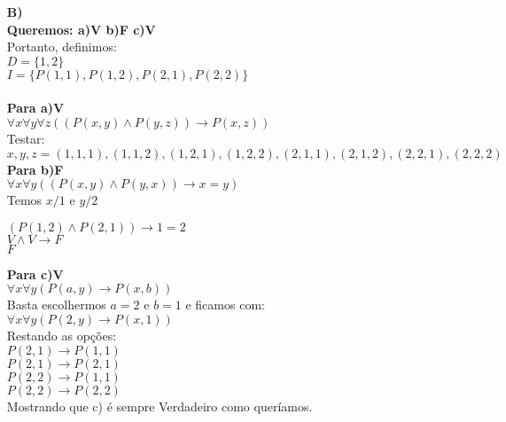 \documentclass[12pt]{article}
\begin{document}
\begin{itemize}
\begin{itemize}
					\item[\textbf{B)}]
						\hfill\\
						\textbf{Queremos: a)V b)F c)V}\\
						Portanto, definimos:\\
						$D = \lbrace 1, 2 \rbrace$\\
						$I = \lbrace P(1, 1), P(1, 2), P(2, 1), P(2, 2)\rbrace$\\ \\
						\textbf{Para a)V}\\
						$\forall x \forall y \forall z ((P(x,y) \wedge P(y,z)) \rightarrow P(x, z))$\\
						Testar:\\
						$x, y, z = (1, 1, 1) , (1, 1, 2), (1, 2, 1), (1, 2, 2), (2, 1, 1),
						(2, 1, 2), (2, 2, 1), (2, 2, 2)$\\
						
						\textbf{Para b)F}\\
						$\forall x \forall y ((P(x,y) \wedge P(y,x)) \rightarrow x = y)$\\
						Temos $x/1$ e $y/2$\\
						\begin{center}
							$(P(1,2) \wedge P(2,1)) \rightarrow 1 = 2$\\
							$V \wedge V \rightarrow F$\\
							$F$
						\end{center}
						\textbf{Para c)V}\\
						$\forall x \forall y (P(a,y) \rightarrow P(x, b))$\\
						Basta escolhermos $a = 2$ e $b = 1$ e ficamos com:\\
						$\forall x \forall y (P(2,y) \rightarrow P(x, 1))$\\
						Restando as opções:\\
						$P(2,1) \rightarrow P(1, 1)$\\
						$P(2,1) \rightarrow P(2, 1)$\\
						$P(2,2) \rightarrow P(1, 1)$ \\
						$P(2,2) \rightarrow P(2, 2)$\\
						Mostrando que c) é sempre Verdadeiro como queríamos.
						

\end{itemize}
\end{itemize}
\end{document}
